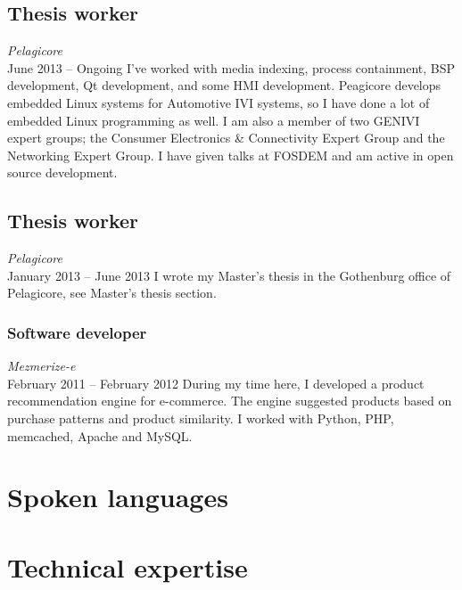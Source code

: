 \documentclass{twocolcv}
\begin{document}
\subsection*{Thesis worker}
\emph{Pelagicore}\\
June 2013 -- Ongoing \newline\newline
I've worked with media indexing, process containment, BSP development, Qt development, and some HMI development. Peagicore develops embedded Linux systems for Automotive IVI systems, so I have done a lot of embedded Linux programming as well. I am also a member of two GENIVI expert groups; the Consumer Electronics \& Connectivity Expert Group and the Networking Expert Group. I have given talks at FOSDEM and am active in open source development.

\subsection*{Thesis worker}
\emph{Pelagicore}\\
January 2013 -- June 2013 \newline\newline
I wrote my Master's thesis in the Gothenburg office of Pelagicore, see Master's thesis section.

\subsubsection*{Software developer}
\emph{Mezmerize-e} \\
February 2011 -- February 2012\newline\newline
During my time here, I developed a product recommendation engine for e-commerce. The engine suggested products based on purchase patterns and product similarity. I worked with Python, PHP, memcached, Apache and MySQL.

\section*{Spoken languages}

\section*{Technical expertise}
\end{document}
